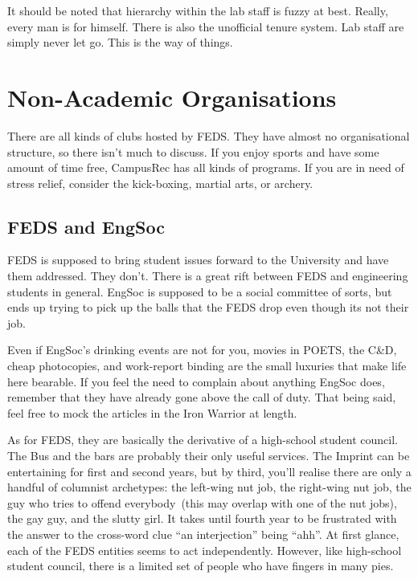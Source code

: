 \documentclass{book}
\begin{document}


It should be noted that hierarchy within the lab staff is fuzzy at best. Really, every man is for himself. There is also the unofficial tenure system. Lab staff are simply never let go. This is the way of things.

\section{Non-Academic Organisations}
There are all kinds of clubs hosted by FEDS. They have almost no organisational structure, so there isn't much to discuss. If you enjoy sports and have some amount of time free, CampusRec has all kinds of programs. If you are in need of stress relief, consider the kick-boxing, martial arts, or archery.

\subsection{FEDS and EngSoc}
FEDS is supposed to bring student issues forward to the University and have them addressed. They don't. There is a great rift between FEDS and engineering students in general. EngSoc is supposed to be a social committee of sorts, but ends up trying to pick up the balls that the FEDS drop even though its not their job.

Even if EngSoc's drinking events are not for you, movies in POETS, the C\&D, cheap photocopies, and work-report binding are the small luxuries that make life here bearable. If you feel the need to complain about anything EngSoc does, remember that they have already gone above the call of duty. That being said, feel free to mock the articles in the Iron Warrior at length.

As for FEDS, they are basically the derivative of a high-school student council. The Bus and the bars are probably their only useful services. The Imprint can be entertaining for first and second years, but by third, you'll realise there are only a handful of columnist archetypes: the left-wing nut job, the right-wing nut job, the guy who tries to offend everybody~(this may overlap with one of the nut jobs), the gay guy, and the slutty girl. It takes until fourth year to be frustrated with the answer to the cross-word clue ``an interjection'' being ``ahh''.  At first glance, each of the FEDS entities seems to act independently. However, like high-school student council, there is a limited set of people who have fingers in many pies.
\end{document}
